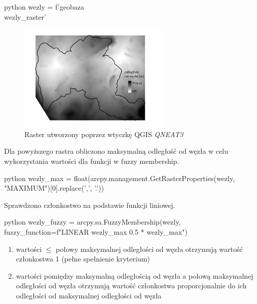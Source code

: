 \documentclass{article}
\begin{document}
\begin{mintedbox}{python}
wezly = f'{geobaza}\\wezly_raster'
\end{mintedbox}

\begin{figure}[H]
    \centering
    \includegraphics[width=0.65\textwidth]{img/kryterium7-wezly.jpg}
    \caption{Raster utworzony poprzez wtyczkę QGIS  \textit{QNEAT3}}
\end{figure}
\vspace{10pt}

Dla powyższego rastra obliczono maksymalną odległość od węzła w celu wykorzystania wartości dla funkcji w fuzzy membership.
\vspace{5pt}

\begin{mintedbox}{python}
wezly_max = float(arcpy.management.GetRasterProperties(wezly, "MAXIMUM")[0].replace(',', '.'))
\end{mintedbox}
\vspace{10pt}

Sprawdzono członkostwo na podstawie funkcji liniowej.
\vspace{5pt}

\begin{mintedbox}{python}
wezly_fuzzy = arcpy.sa.FuzzyMembership(wezly, fuzzy_function=f"LINEAR {wezly_max} {0.5 * wezly_max}")
\end{mintedbox}
\vspace{5pt}

\begin{enumerate}[label=•]
    \item wartości \( \leq \) połowy maksymalnej odległości od węzła otrzymują wartość członkostwa 1 (pełne spełnienie kryterium)
    \item wartości pomiędzy maksymalną odległością od węzła a połową maksymalnej odległości od węzła otrzymują wartość członkostwa proporcjonalnie do ich odległości od maksymalnej odległości od węzła
\end{enumerate}
\end{document}
